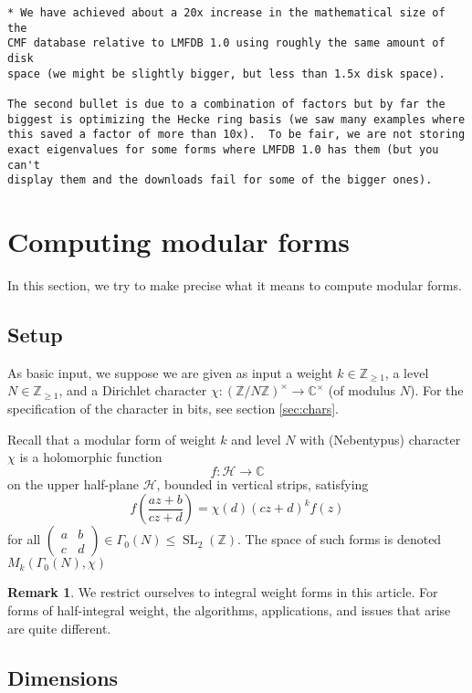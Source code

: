 \documentclass[11pt]{amsart}
\numberwithin{equation}{subsection}
\theoremstyle{plain}
\theoremstyle{definition}
\newtheorem{rmk}[equation]{Remark}
\newcommand{\Z}{\mathbb{Z}}
\newcommand{\C}{\mathbb{C}}
\newcommand{\defi}[1]{\textsf{#1}} 	%
\DeclareMathOperator{\SL}{SL}
\begin{document}
\begin{verbatim}
* We have achieved about a 20x increase in the mathematical size of the 
CMF database relative to LMFDB 1.0 using roughly the same amount of disk 
space (we might be slightly bigger, but less than 1.5x disk space).

The second bullet is due to a combination of factors but by far the 
biggest is optimizing the Hecke ring basis (we saw many examples where 
this saved a factor of more than 10x).  To be fair, we are not storing 
exact eigenvalues for some forms where LMFDB 1.0 has them (but you can't 
display them and the downloads fail for some of the bigger ones).
\end{verbatim}

\section{Computing modular forms} \label{sec:compmf}

In this section, we try to make precise what it means to compute modular forms.

\subsection{Setup}

As basic input, we suppose we are given as input a weight $k \in \Z_{\geq 1}$, a level $N \in \Z_{\geq 1}$, and a Dirichlet character $\chi \colon (\Z/N\Z)^\times \to \C^\times$ (of modulus $N$).  For the specification of the character in bits, see section \ref{sec:chars}.  

Recall that a \defi{modular form} of weight $k$ and level $N$ with (Nebentypus) character $\chi$ is a holomorphic function
\[ f \colon \mathcal{H} \to \C \]
on the upper half-plane $\mathcal{H}$, bounded in vertical strips, satisfying
\[ f\left(\frac{az+b}{cz+d}\right)=\chi(d)(cz+d)^k f(z) \]
for all $\begin{pmatrix} a & b \\ c & d \end{pmatrix} \in \Gamma_0(N) \leq \SL_2(\Z)$.  The space of such forms is denoted $M_k(\Gamma_0(N),\chi)$

\begin{rmk}
We restrict ourselves to integral weight forms in this article.  For forms of half-integral weight, the algorithms, applications, and issues that arise are quite different.  
\end{rmk}

\subsection{Dimensions}
\end{document}
